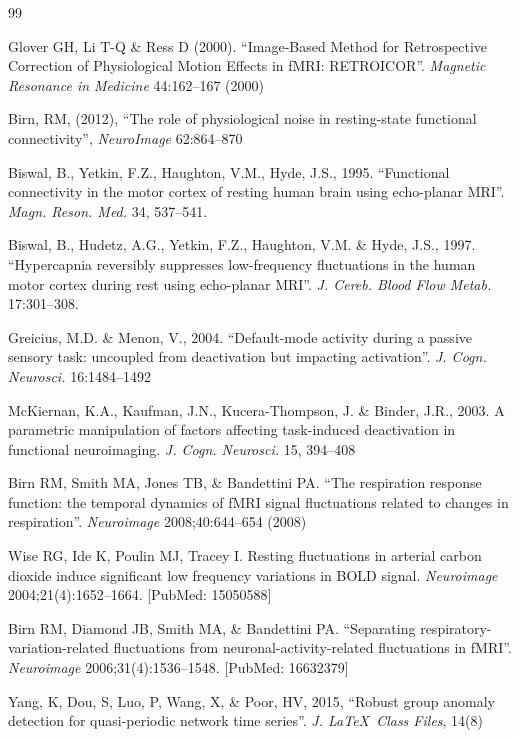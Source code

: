 \documentclass[twoside,twocolumn]{article}
\begin{document}
\begin{thebibliography}{99} %
	
	 Glover GH, Li T-Q \& Ress D (2000). ``Image-Based Method for Retrospective Correction of Physiological Motion Effects in fMRI: RETROICOR''. {\em Magnetic Resonance in Medicine} 44:162–167 (2000)
	
	 Birn, RM, (2012), ``The role of physiological noise in resting-state functional connectivity'', {\em NeuroImage} 62:864–870
	
	 Biswal, B., Yetkin, F.Z., Haughton, V.M., Hyde, J.S., 1995. ``Functional connectivity in the motor cortex of resting human brain using echo-planar MRI''. {\em Magn. Reson. Med.} 34, 537–541.
	
	 Biswal, B., Hudetz, A.G., Yetkin, F.Z., Haughton, V.M. \& Hyde, J.S., 1997. ``Hypercapnia reversibly suppresses low-frequency ﬂuctuations in the human motor cortex during rest using echo-planar MRI''. {\em J. Cereb. Blood Flow Metab.} 17:301–308.
	
	 Greicius, M.D. \& Menon, V., 2004. ``Default-mode activity during a passive sensory task: uncoupled from deactivation but impacting activation''. {\em J. Cogn. Neurosci.} 16:1484–1492
	
	 McKiernan, K.A., Kaufman, J.N., Kucera-Thompson, J. \& Binder, J.R., 2003. A parametric manipulation of factors affecting task-induced deactivation in functional neuroimaging. {\em J. Cogn. Neurosci.} 15, 394–408
	
	 Birn RM, Smith MA, Jones TB, \& Bandettini PA. ``The respiration response function: the temporal dynamics of fMRI signal fluctuations related to changes in respiration''. {\em Neuroimage} 2008;40:644–654 (2008)
	
	 Wise RG, Ide K, Poulin MJ, Tracey I. Resting fluctuations in arterial carbon dioxide induce significant low frequency variations in BOLD signal. {\em Neuroimage} 2004;21(4):1652–1664. [PubMed: 15050588]
	
	 Birn RM, Diamond JB, Smith MA, \& Bandettini PA. ``Separating respiratory-variation-related fluctuations from neuronal-activity-related fluctuations in fMRI''. {\em Neuroimage} 2006;31(4):1536–1548. [PubMed: 16632379]
	
	 Yang, K, Dou, S, Luo, P, Wang, X, \&  Poor, HV, 2015, ``Robust group anomaly detection for quasi-periodic network time series''. {\em J. \LaTeX\ Class Files}, 14(8)
	

\end{thebibliography}
\end{document}
